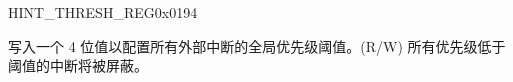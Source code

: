 \begin{register}{H}{INT\_THRESH\_REG}{0x0194}\label{regdesc:INTTHRESHREG}
%
%
\regnewline%
\begin{regdesc}
\begin{reglist}
\label{fielddesc:INTTHRESH}\item [INT\_THRESH] 写入一个 4 位值以配置所有外部中断的全局优先级阈值。(R/W) \newline 所有优先级低于阈值的中断将被屏蔽。 \newline
\end{reglist}
\end{regdesc}
\end{register}
